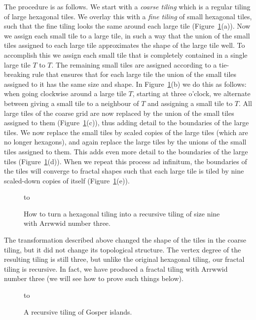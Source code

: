 \documentclass[11pt,a4paper]{article}
\begin{document}
The procedure is as follows. We start with a \emph{coarse tiling} which is a regular tiling of large hexagonal tiles. We overlay this with a \emph{fine tiling} of small hexagonal tiles, such that the fine tiling looks the same around each large tile (Figure~\ref{fig:recursification}(a)). Now we assign each small tile to a large tile, in such a way that the union of the small tiles assigned to each large tile approximates the shape of the large tile well. To accomplish this we assign each small tile that is completely contained in a single large tile $T$ to $T$. The remaining small tiles are assigned according to a tie-breaking rule that ensures that for each large tile the union of the small tiles assigned to it has the same size and shape. In Figure~\ref{fig:recursification}(b) we do this as follows: when going clockwise around a large tile $T$, starting at three o'clock, we alternate between giving a small tile to a neighbour of $T$ and assigning a small tile to $T$. All large tiles of the coarse grid are now replaced by the union of the small tiles assigned to them (Figure~\ref{fig:recursification}(c)), thus adding detail to the boundaries of the large tiles. We now replace the small tiles by scaled copies of the large tiles (which are no longer hexagons), and again replace the large tiles by the unions of the small tiles assigned to them. This adds even more detail to the boundaries of the large tiles (Figure~\ref{fig:recursification}(d)). When we repeat this process ad infinitum, the boundaries of the tiles will converge to fractal shapes such that each large tile is tiled by nine scaled-down copies of itself (Figure~\ref{fig:recursification}(e)).

\begin{figure}
\centering
\hbox to 
\caption{How to turn a hexagonal tiling into a recursive tiling of size nine with Arrwwid number three.}
\label{fig:recursification}
\end{figure}

The transformation described above changed the shape of the tiles in the coarse tiling, but it did not change its topological structure. The vertex degree of the resulting tiling is still three, but unlike the original hexagonal tiling, our fractal tiling is recursive. In fact, we have produced a fractal tiling with Arrwwid number three (we will see how to prove such things below).

\begin{figure}
\centering
\hbox to 
\caption{A recursive tiling of Gosper islands.}
\label{fig:gosper}
\end{figure}
\end{document}
